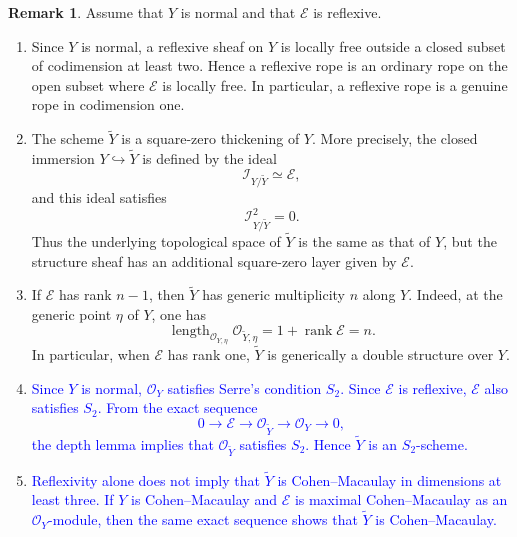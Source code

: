\documentclass[11pt,twoside]{amsart}
\theoremstyle{plain}
\numberwithin{equation}{section}
\theoremstyle{definition}
\newtheorem{remark}[theorem]{Remark}
\begin{document}
\begin{remark}
\label{rem:properties-reflexive-rope}
Assume that \(Y\) is normal and that \(\mathcal E\) is reflexive.

\begin{enumerate}
    \item Since \(Y\) is normal, a reflexive sheaf on \(Y\) is locally free outside a closed
    subset of codimension at least two. Hence a reflexive rope is an ordinary rope on
    the open subset where \(\mathcal E\) is locally free. In particular, a reflexive rope
    is a genuine rope in codimension one.

    \item The scheme \(\widetilde Y\) is a square-zero thickening of \(Y\). More precisely,
    the closed immersion \(Y\hookrightarrow \widetilde Y\) is defined by the ideal
    \[
        \mathcal I_{Y/\widetilde Y}\simeq \mathcal E,
    \]
    and this ideal satisfies
    \[
        \mathcal I_{Y/\widetilde Y}^{2}=0.
    \]
    Thus the underlying topological space of \(\widetilde Y\) is the same as that of \(Y\),
    but the structure sheaf has an additional square-zero layer given by \(\mathcal E\).

    \item If \(\mathcal E\) has rank \(n-1\), then \(\widetilde Y\) has generic multiplicity
    \(n\) along \(Y\). Indeed, at the generic point \(\eta\) of \(Y\), one has
    \[
        \operatorname{length}_{\mathcal O_{Y,\eta}}
        \mathcal O_{\widetilde Y,\eta}
        =
        1+\operatorname{rank}\mathcal E
        =
        n.
    \]
    In particular, when \(\mathcal E\) has rank one, \(\widetilde Y\) is generically a
    double structure over \(Y\).

    \item \textcolor{blue}{Since \(Y\) is normal, \(\mathcal O_Y\) satisfies Serre's condition \(S_2\).
    Since \(\mathcal E\) is reflexive, \(\mathcal E\) also satisfies \(S_2\). From the exact
    sequence
    \[
        0\longrightarrow \mathcal E
        \longrightarrow \mathcal O_{\widetilde Y}
        \longrightarrow \mathcal O_Y
        \longrightarrow 0,
    \]
    the depth lemma implies that \(\mathcal O_{\widetilde Y}\) satisfies \(S_2\). Hence
    \(\widetilde Y\) is an \(S_2\)-scheme.}

    \item \textcolor{blue}{Reflexivity alone does not imply that \(\widetilde Y\) is Cohen--Macaulay in
    dimensions at least three. If \(Y\) is Cohen--Macaulay and \(\mathcal E\) is maximal
    Cohen--Macaulay as an \(\mathcal O_Y\)-module, then the same exact sequence shows
    that \(\widetilde Y\) is Cohen--Macaulay.}

   
\end{enumerate}
\end{remark}
\end{document}
